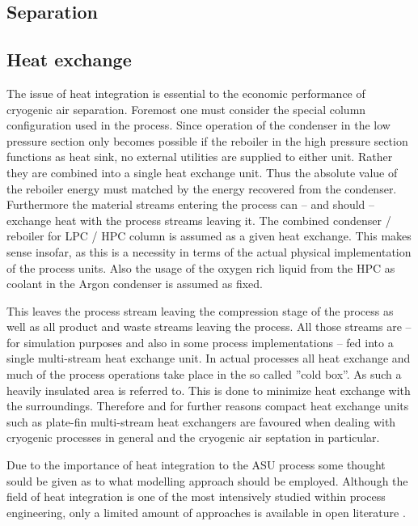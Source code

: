 \subsection{Separation}
\label{sec:mathpro:steady:sep}
    
    
\subsection{Heat exchange}
\label{sec:mathpro:steady:hx}
    The issue of heat integration is essential to the economic performance of cryogenic air separation. Foremost
    one must consider the special column configuration used in the process. Since operation of the condenser in the
    low pressure section only becomes possible if the reboiler in the high pressure section functions as heat sink,
    no external utilities are supplied to either unit. Rather they are combined into a single heat exchange unit. Thus
    the absolute value of the reboiler energy must matched by the energy recovered from the condenser. Furthermore
    the material streams entering the process can -- and should -- exchange heat with the process streams leaving it.
    The combined condenser / reboiler for LPC / HPC column is assumed as a given heat exchange. This makes sense insofar,
    as this is a necessity in terms of the actual physical implementation of the process units. Also the usage of the
    oxygen rich liquid from the HPC as coolant in the Argon condenser is assumed as fixed.

    This leaves the process stream leaving the compression stage of the process as well as all product and waste streams
    leaving the process. All those streams are -- for simulation purposes and also in some process implementations  -- fed
    into a single multi-stream heat exchange unit. In actual processes all heat exchange and much of the process operations
    take place in the so called ''cold box''. As such a heavily insulated area is referred to. This is done to minimize
    heat exchange with the surroundings. Therefore and for further reasons compact heat exchange units such as plate-fin
    multi-stream heat exchangers are favoured when dealing with cryogenic processes in general and the cryogenic air septation
    in particular.

    Due to the importance of heat integration to the ASU process some thought sould be given as to what modelling approach
    should be employed. Although the field of heat integration is one of the most intensively studied within process engineering,
    only  a limited amount of approaches is available in open literature \cite{Kamath.2012}.

